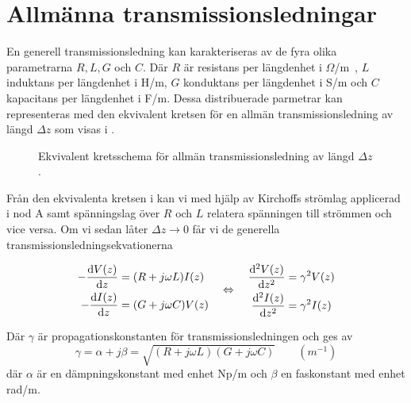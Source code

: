 \documentclass[../../main.tex]{subfiles}
\begin{document}
\chapter{Allmänna transmissionsledningar}
\label{app:trans}
En generell transmissionsledning kan karakteriseras av de fyra olika parametrarna $R, L, G$ och $C$. Där $R$ är resistans per längdenhet i \unit{$\Omega$/m}, $L$ induktans per längdenhet i \unit{H/m}, $G$ konduktans per längdenhet i \unit{S/m} och $C$ kapacitans per längdenhet i \unit{F/m}. Dessa distribuerade parmetrar kan representeras med den ekvivalent kretsen för en allmän transmissionsledning av längd $\Delta z$ som visas i \autocite{cheng}.


\begin{figure}[H]
\centering
{}
\begin{circuitikz}
[line width=1pt,scale=0.75]
\end{circuitikz}
\caption{Ekvivalent kretsschema för allmän transmissionsledning av längd $\Delta z$.}
\label{fig:transmission_eqv}
\end{figure}



Från den ekvivalenta kretsen i  kan vi med hjälp av Kirchoffs strömlag applicerad i nod A samt spänningslag över $R$ och $L$ relatera spänningen till strömmen och vice versa. Om vi sedan låter $\Delta z\rightarrow 0$ får vi de generella transmissionsledningsekvationerna

\begin{equation}
    \centering
    \begin{split}    
        -\dv{V(z)}{z}&=(R+j\omega L)I(z)\\ -\dv{I(z)}{z}&=(G+j\omega C)V(z)
    \end{split}
    \quad\Leftrightarrow\quad
    \begin{split}
        \dv{^2V(z)}{z^2}&=\gamma^2V(z)\\     \dv{^2I(z)}{z^2}&=\gamma^2I(z)
    \end{split}
\end{equation}


Där $\gamma$ är propagationskonstanten för transmissionsledningen och ges av
\begin{equation*}
    \gamma=\alpha +j\beta = \sqrt{(R+j\omega L)(G+j\omega C)} \hspace{2em} (\unit{m^{-1}})
\end{equation*}
där $\alpha$ är en dämpningskonstant med enhet \unit{Np/m} och $\beta$ en faskonstant med enhet \unit{rad/m}.
\end{document}
